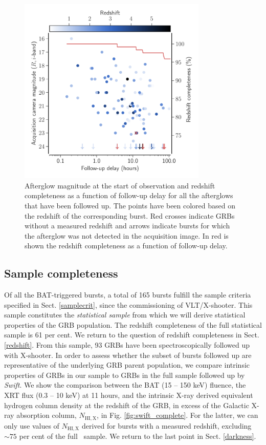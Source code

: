 \documentclass{aa}    %
\begin{document}
\begin{figure}
	\centerline{\includegraphics[width=9cm]{figures/timing.pdf}} \caption{Afterglow
	magnitude at the start of observation and redshift completeness as a function
	of follow-up delay for all the afterglows that have been followed up. The
	points have been colored based on the redshift of the corresponding burst. Red
	crosses indicate GRBs without a measured redshift and arrows indicate bursts
	for which the afterglow was not detected in the acquisition image. In red is
	shown the redshift completeness as a function of follow-up delay.}
\label{fig:timing}
\end{figure}
\subsection{Sample completeness} \label{completeness}

Of all the BAT-triggered bursts, a total of 165 bursts fulfill the sample
criteria specified in Sect. \ref{samplecrit}, since the commissioning of
VLT/X-shooter. This sample constitutes the \textit{statistical sample} from
which we will derive statistical properties of the GRB population. The redshift
completeness of the full statistical sample is 61 per cent. We return to the
question of redshift completeness in Sect. \ref{redshift}. From this sample, 93
GRBs have been spectroscopically followed up with X-shooter. In order to assess
whether the subset of bursts followed up are representative of the underlying
GRB parent population, we compare intrinsic properties of GRBs in our sample to
GRBs in the full sample followed up by \textit{Swift}. We show the comparison
between the BAT (15 -- 150 keV) fluence, the XRT flux (0.3 -- 10 keV) at 11
hours, and the intrinsic X-ray derived equivalent hydrogen column density at the
redshift of the GRB, in excess of the Galactic X-ray absorption column,
$N_{\mathrm{HI,X}}$, in Fig. \ref{fig:swift_complete}. For the latter, we can
only use values of $N_{\mathrm{HI,X}}$ derived for bursts with a measured
redshift, excluding $\sim 75$ per cent of the full \swift~sample. We return to
the last point in Sect. \ref{darkness}.
\end{document}
